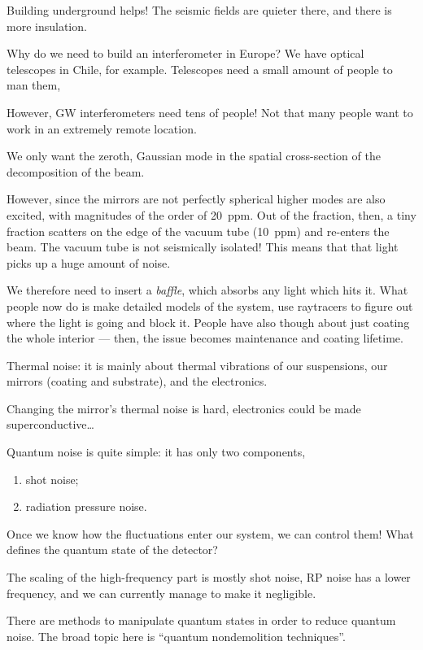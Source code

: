 \documentclass[main.tex]{subfiles}
\begin{document}
Building underground helps! The seismic fields are quieter there, and
there is more insulation. 

Why do we need to build an interferometer in Europe? 
We have optical telescopes in Chile, for example. 
Telescopes need a small amount of people to man them, 

However, GW interferometers need tens of people! 
Not that many people want to work in an extremely remote location. 

We only want the zeroth, Gaussian mode in the spatial 
cross-section of the decomposition of the beam. 

However, since the mirrors are not perfectly spherical higher modes
are also excited, with magnitudes of the order of \SI{20}{ppm}. 
Out of the fraction, then, a tiny fraction scatters on the edge of the 
vacuum tube (\SI{10}{ppm}) and re-enters the beam.
The vacuum tube is not seismically isolated! 
This means that that light picks up a huge amount of noise. 

We therefore need to insert a \emph{baffle}, which 
absorbs any light which hits it. 
What people now do is make detailed models of the system, 
use raytracers to figure out where the light is going 
and block it. 
People have also though about just coating the whole interior --- then, the issue becomes maintenance and coating lifetime.

Thermal noise: it is mainly about thermal vibrations of 
our suspensions, our mirrors (coating and substrate), and the electronics.

Changing the mirror's thermal noise is hard, 
electronics could be made superconductive\dots

Quantum noise is quite simple: it has only two components, 
\begin{enumerate}
    \item shot noise;
    \item radiation pressure noise.
\end{enumerate}

Once we know how the fluctuations enter our system, we can control them! 
What defines the quantum state of the detector? 

The scaling of the high-frequency part is mostly shot noise, RP noise has a lower frequency, and we can currently manage to make it negligible.

There are methods to manipulate quantum states in order to reduce quantum noise. 
The broad topic here is ``quantum nondemolition techniques''. 
\end{document}
